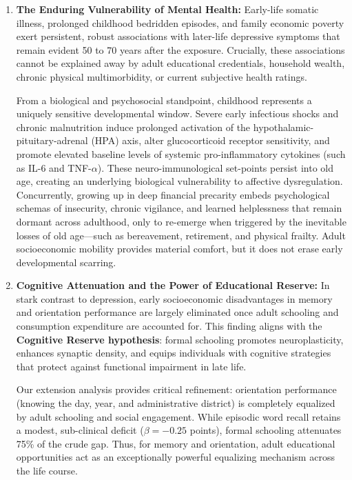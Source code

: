 \begin{enumerate}
    \item \textbf{The Enduring Vulnerability of Mental Health:}
    Early-life somatic illness, prolonged childhood bedridden episodes, and family economic poverty exert persistent, robust associations with later-life depressive symptoms that remain evident 50 to 70 years after the exposure. Crucially, these associations cannot be explained away by adult educational credentials, household wealth, chronic physical multimorbidity, or current subjective health ratings. 
    
    From a biological and psychosocial standpoint, childhood represents a uniquely sensitive developmental window. Severe early infectious shocks and chronic malnutrition induce prolonged activation of the hypothalamic-pituitary-adrenal (HPA) axis, alter glucocorticoid receptor sensitivity, and promote elevated baseline levels of systemic pro-inflammatory cytokines (such as IL-6 and TNF-$\alpha$). These neuro-immunological set-points persist into old age, creating an underlying biological vulnerability to affective dysregulation. Concurrently, growing up in deep financial precarity embeds psychological schemas of insecurity, chronic vigilance, and learned helplessness that remain dormant across adulthood, only to re-emerge when triggered by the inevitable losses of old age—such as bereavement, retirement, and physical frailty. Adult socioeconomic mobility provides material comfort, but it does not erase early developmental scarring.

    \item \textbf{Cognitive Attenuation and the Power of Educational Reserve:}
    In stark contrast to depression, early socioeconomic disadvantages in memory and orientation performance are largely eliminated once adult schooling and consumption expenditure are accounted for. This finding aligns with the \textbf{Cognitive Reserve hypothesis}: formal schooling promotes neuroplasticity, enhances synaptic density, and equips individuals with cognitive strategies that protect against functional impairment in late life. 

    Our extension analysis provides critical refinement: orientation performance (knowing the day, year, and administrative district) is completely equalized by adult schooling and social engagement. While episodic word recall retains a modest, sub-clinical deficit ($\beta = -0.25$ points), formal schooling attenuates 75\% of the crude gap. Thus, for memory and orientation, adult educational opportunities act as an exceptionally powerful equalizing mechanism across the life course.
\end{enumerate}


